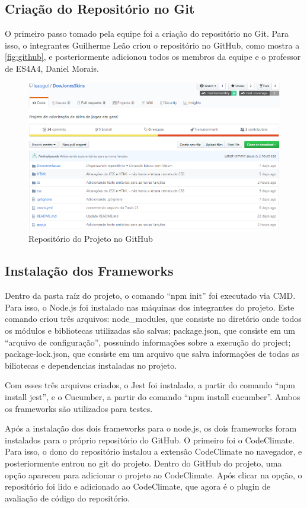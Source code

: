 \subsection{Criação do Repositório no Git}
O primeiro passo tomado pela equipe foi a criação do repositório no Git. Para isso, o integrantes
Guilherme Leão criou o repositório no GitHub, como mostra a \autoref{fig:github}, e posteriormente adicionou todos os membros
da equipe e o professor de ES4A4, Daniel Morais.\\
\begin{figure}[!htb]
	\centering
	\includegraphics[scale=0.6]{Imagens/Repositorio.png}
	\caption{Repositório do Projeto no GitHub}
	\label{fig:github}
\end{figure}

\subsection{Instalação dos Frameworks}
Dentro da pasta raíz do projeto, o comando ``npm init'' foi executado via CMD. Para isso, o Node.js foi instalado
nas máquinas dos integrantes do projeto. Este comando criou três arquivos: node\_modules, que consiste no diretório onde todos
os módulos e bibliotecas utilizadas são salvas; package.json, que consiste em um ``arquivo de configuração'',
possuindo informações sobre a execução do project; package-lock.json, que consiste em um arquivo que salva
informações de todas as biliotecas e dependencias instaladas no projeto.

Com esses três arquivos criados, o Jest foi instalado, a partir do comando ``npm install jest'', e o Cucumber, a partir
do comando ``npm install cucumber''. Ambos os frameworks são utilizados para testes.

Após a instalação dos dois frameworks para o node.js, os dois frameworks foram instalados para o próprio repositório do GitHub.
O primeiro foi o CodeClimate. Para isso, o dono do repositório instalou a extensão CodeClimate no navegador,
e posteriormente entrou no git do projeto. Dentro do GitHub do projeto, uma opção apareceu para adicionar
o projeto ao CodeClimate. Após clicar na opção, o repositório foi lido e adicionado ao CodeClimate, 
que agora é o plugin de avaliação de código do repositório.

